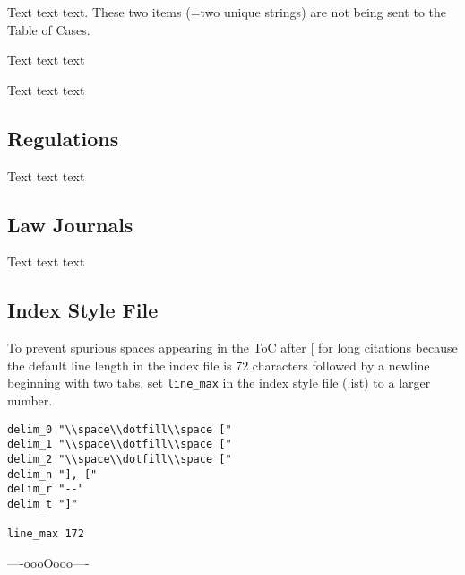 \p Text text text. These two items (=two unique strings) are not being sent to the Table of Cases. 

\lcsetindexingoff{}\lcsetindexingon
\bigskip 

\p Text text text 

\bigskip 

\p Text text text 

\bigskip 


\subsection*{Regulations}

\p Text text text 

\bigskip 


\subsection*{Law Journals}

\p Text text text 

\bigskip 

\subsection*{Index Style File}
\p To prevent spurious spaces appearing in the ToC after [ for long citations because the default line length in the index file is 72 characters followed by a newline beginning with two tabs, set \verb|line_max| in the index style file (.ist) to a larger number.

\begin{verbatim}
delim_0 "\\space\\dotfill\\space ["
delim_1 "\\space\\dotfill\\space ["
delim_2 "\\space\\dotfill\\space ["
delim_n "], ["
delim_r "--"
delim_t "]"

line_max 172

\end{verbatim}
\bigskip 


\hfill ----oooOooo---- \hfill\ 
